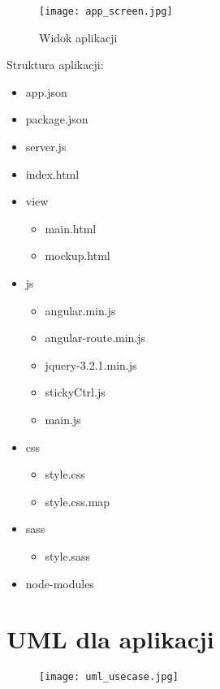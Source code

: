 \documentclass[a4paper]{article}
\begin{document}
\begin{figure}[h]
   \texttt{[image: app\_screen.jpg]}
   \caption{Widok aplikacji}
\end{figure}

\newpage

{Struktura aplikacji:}

\begin{itemize}
    \item app.json
    \item package.json
    \item server.js
    \item index.html
    \item view
    \begin{itemize}
        \item main.html
        \item mockup.html
    \end{itemize}
    \item js
    \begin{itemize}
        \item angular.min.js
        \item angular-route.min.js
        \item jquery-3.2.1.min.js
        \item stickyCtrl.js
        \item main.js
    \end{itemize}
    \item css
    \begin{itemize}
        \item style.css
        \item style.css.map
    \end{itemize}
    \item sass
    \begin{itemize}
        \item style.sass
    \end{itemize}
    \item node-modules
\end{itemize}

\newpage

\section{UML dla aplikacji}

\begin{figure}[h]
   \texttt{[image: uml\_usecase.jpg]}
\end{figure}
\end{document}
